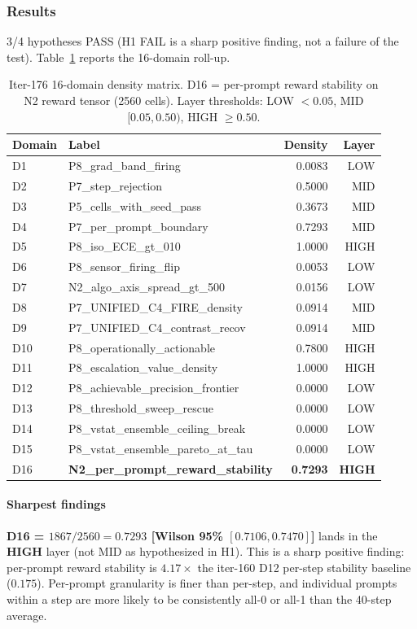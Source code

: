 \documentclass{article}
\begin{document}
\subsubsection{Results}
3/4 hypotheses PASS (H1 FAIL is a sharp positive finding, not a
failure of the test). Table~\ref{tab:synth-iter176-d16} reports the
16-domain roll-up.

\begin{table}[h]
\centering\small
\caption{Iter-176 16-domain density matrix. D16 = per-prompt reward
stability on N2 reward tensor (2560 cells). Layer thresholds:
LOW $<0.05$, MID $[0.05, 0.50)$, HIGH $\ge 0.50$.}
\label{tab:synth-iter176-d16}
\begin{tabular}{llrr}
\hline
Domain & Label & Density & Layer \\
\hline
D1  & P8\_grad\_band\_firing & 0.0083 & LOW \\
D2  & P7\_step\_rejection & 0.5000 & MID \\
D3  & P5\_cells\_with\_seed\_pass & 0.3673 & MID \\
D4  & P7\_per\_prompt\_boundary & 0.7293 & MID \\
D5  & P8\_iso\_ECE\_gt\_010 & 1.0000 & HIGH \\
D6  & P8\_sensor\_firing\_flip & 0.0053 & LOW \\
D7  & N2\_algo\_axis\_spread\_gt\_500 & 0.0156 & LOW \\
D8  & P7\_UNIFIED\_C4\_FIRE\_density & 0.0914 & MID \\
D9  & P7\_UNIFIED\_C4\_contrast\_recov & 0.0914 & MID \\
D10 & P8\_operationally\_actionable & 0.7800 & HIGH \\
D11 & P8\_escalation\_value\_density & 1.0000 & HIGH \\
D12 & P8\_achievable\_precision\_frontier & 0.0000 & LOW \\
D13 & P8\_threshold\_sweep\_rescue & 0.0000 & LOW \\
D14 & P8\_vstat\_ensemble\_ceiling\_break & 0.0000 & LOW \\
D15 & P8\_vstat\_ensemble\_pareto\_at\_tau & 0.0000 & LOW \\
D16 & \textbf{N2\_per\_prompt\_reward\_stability} & \textbf{0.7293} & \textbf{HIGH} \\
\hline
\end{tabular}
\end{table}

\paragraph{Sharpest findings}
\textbf{D16 = $1867/2560 = 0.7293$ [Wilson 95\% $[0.7106, 0.7470]$]}
lands in the \textbf{HIGH} layer (not MID as hypothesized in H1).
This is a sharp positive finding: per-prompt reward stability is
$4.17\times$ the iter-160 D12 per-step stability baseline
($0.175$). Per-prompt granularity is finer than per-step, and
individual prompts within a step are more likely to be consistently
all-0 or all-1 than the 40-step average.
\end{document}
